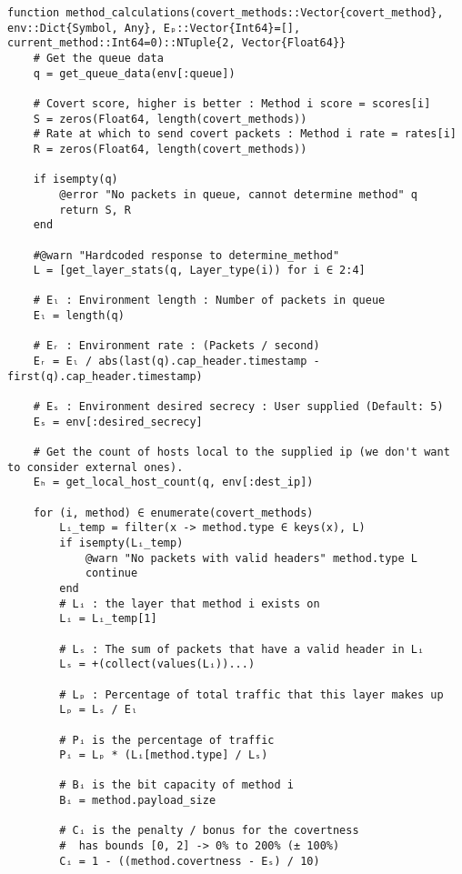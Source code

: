 \begin{lstlisting}[language=JuliaLocal, style=julia]
function method_calculations(covert_methods::Vector{covert_method}, env::Dict{Symbol, Any}, Eₚ::Vector{Int64}=[], current_method::Int64=0)::NTuple{2, Vector{Float64}}
    # Get the queue data
    q = get_queue_data(env[:queue])

    # Covert score, higher is better : Method i score = scores[i]
    S = zeros(Float64, length(covert_methods))
    # Rate at which to send covert packets : Method i rate = rates[i]
    R = zeros(Float64, length(covert_methods))
    
    if isempty(q)
        @error "No packets in queue, cannot determine method" q
        return S, R
    end
    
    #@warn "Hardcoded response to determine_method"
    L = [get_layer_stats(q, Layer_type(i)) for i ∈ 2:4]

    # Eₗ : Environment length : Number of packets in queue
    Eₗ = length(q)

    # Eᵣ : Environment rate : (Packets / second)
    Eᵣ = Eₗ / abs(last(q).cap_header.timestamp - first(q).cap_header.timestamp)

    # Eₛ : Environment desired secrecy : User supplied (Default: 5)
    Eₛ = env[:desired_secrecy]

    # Get the count of hosts local to the supplied ip (we don't want to consider external ones).
    Eₕ = get_local_host_count(q, env[:dest_ip])

    for (i, method) ∈ enumerate(covert_methods)
        Lᵢ_temp = filter(x -> method.type ∈ keys(x), L)
        if isempty(Lᵢ_temp)
            @warn "No packets with valid headers" method.type L
            continue
        end
        # Lᵢ : the layer that method i exists on
        Lᵢ = Lᵢ_temp[1]

        # Lₛ : The sum of packets that have a valid header in Lᵢ
        Lₛ = +(collect(values(Lᵢ))...)

        # Lₚ : Percentage of total traffic that this layer makes up
        Lₚ = Lₛ / Eₗ

        # Pᵢ is the percentage of traffic 
        Pᵢ = Lₚ * (Lᵢ[method.type] / Lₛ)

        # Bᵢ is the bit capacity of method i
        Bᵢ = method.payload_size

        # Cᵢ is the penalty / bonus for the covertness
        #  has bounds [0, 2] -> 0% to 200% (± 100%)
        Cᵢ = 1 - ((method.covertness - Eₛ) / 10)


\end{lstlisting}
